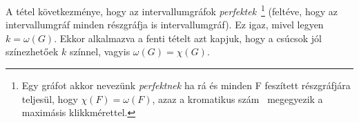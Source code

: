 A tétel következménye, hogy az intervallumgráfok \emph{perfektek}~\footnote{ Egy
	gráfot akkor nevezünk \emph{perfektnek} ha rá és minden F feszített részgráfjára
	teljesül, hogy $\chi(F) = \omega(F)$, azaz a kromatikus szám~\footnotemark{}
	megegyezik a maximásis klikkmérettel.} (feltéve, hogy az intervallumgráf minden részgráfja is intervallumgráf).
Ez igaz, mivel legyen $k=\omega(G)$. Ekkor alkalmazva a fenti tételt azt kapjuk,
hogy a csúcsok jól színezhetőek $k$ színnel, vagyis $\omega(G)=\chi(G)$.
